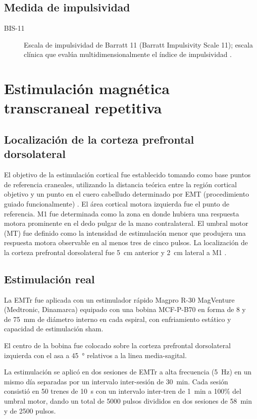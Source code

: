 \subsection{Medida de impulsividad}
\begin{description}
    \item[BIS-11] Escala de impulsividad de Barratt 11 (Barratt Impulsivity Scale 11); escala clínica que evalúa multidimensionalmente el índice de impulsividad \parencite{H.Patton1995,Salvo2013}.
\end{description}

\section{Estimulación magnética transcraneal repetitiva}
\subsection{Localización de la corteza prefrontal dorsolateral}
El objetivo de la estimulación cortical fue establecido tomando como base puntos de referencia craneales, utilizando la distancia teórica entre la región cortical objetivo y un punto en el cuero cabelludo determinado por EMT (procedimiento guiado funcionalmente) \parencite{Sparing2008}.
El área cortical motora izquierda fue el punto de referencia.
M1 fue determinada como la zona en donde hubiera una respuesta motora prominente en el dedo pulgar de la mano contralateral.
El umbral motor (MT) fue definido como la intensidad de estimulación menor que produjera una respuesta motora observable en al menos tres de cinco pulsos.
La localización de la corteza prefrontal dorsolateral fue \SI{5}{\centi\meter} anterior y \SI{2}{\centi\meter} lateral a M1 \parencite{Herwig2001a,Varnava2011a}.

\subsection{Estimulación real}
La EMTr fue aplicada con un estimulador rápido Magpro R-30 MagVenture (Medtronic, Dinamarca) equipado con una bobina MCF-P-B70 en forma de 8 y de \SI{75}{\milli\meter} de diámetro interno en cada espiral, con enfriamiento estático y capacidad de estimulación sham. \par
El centro de la bobina fue colocado sobre la corteza prefrontal dorsolateral izquierda con el asa a \SI{45}{\degree} relativos a la linea media-sagital. \par
La estimulación se aplicó en dos sesiones de EMTr a alta frecuencia (\SI{5}{\hertz}) en un mismo día separadas por un intervalo inter-sesión de \SI{30}{\minute}.
Cada sesión consistió en 50 trenes de \SI{10}{\second} con un intervalo inter-tren de \SI{1}{\minute} a 100\% del umbral motor, dando un total de 5000 pulsos divididos en dos sesiones de \SI{58}{\minute} y de 2500 pulsos.

